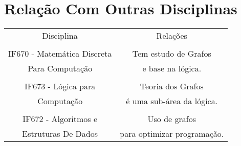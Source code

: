 \documentclass{article}
\begin{document}
\section{Relação Com Outras Disciplinas}
\begin{tabular}{c|c}
  Disciplina   &  Relações \\
   & \\
  IF670 - Matemática Discreta   & Tem estudo de Grafos  \\
  Para Computação & e base na lógica.\\
  \\
  IF673 - Lógica para & Teoria dos Grafos  \\
  Computação & é uma sub-área da lógica. \\
  \\
  IF672 - Algoritmos e  & Uso de grafos	\\
  Estruturas De Dados & para optimizar programação.
\end{tabular}



\end{document}

